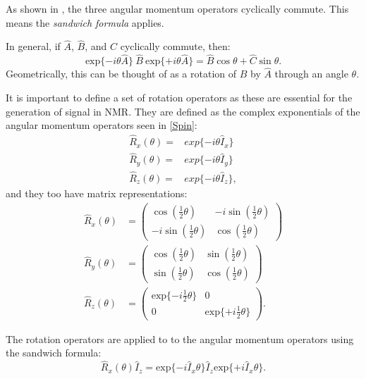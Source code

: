 As shown in , the three angular momentum operators cyclically
commute. This means the \textit{sandwich formula} applies.

In general, if $\hat{A}$, $\hat{B}$, and $\hat{C}$ cyclically commute, then:
\begin{equation}
  \text{exp}\{-i\theta\hat{A}\}\:\hat{B}\:\text{exp}\{+i\theta\hat{A}\} = \hat{B}\cos{\theta} + \hat{C}\sin{\theta}.
\end{equation}
Geometrically, this can be thought of as a rotation of $\hat{B}$ by $\hat{A}$ through
an angle $\theta$.

It is important to define a set of rotation operators as these are essential for the generation of signal in NMR. They are defined as the complex exponentials of the
angular momentum operators seen in \ref{Spin}:
\begin{align}\label{eqn:RotOp}
  \hat{R}_x(\theta) =& exp\{-i\theta\hat{I}_x\}\\
  \hat{R}_y(\theta) =& exp\{-i\theta\hat{I}_y\}\\
  \hat{R}_z(\theta) =& exp\{-i\theta\hat{I}_z\},
\end{align}
 and they too have matrix representations:
 \begin{align}\label{eqn:RotMat}
   \hat{R}_x(\theta)& = \begin{pmatrix}
      \cos(\frac{1}{2}\theta) & -i\sin(\frac{1}{2}\theta)\\
      -i\sin(\frac{1}{2}\theta) & \cos(\frac{1}{2}\theta)
 \end{pmatrix}\\
 \hat{R}_y(\theta)& = \begin{pmatrix}
    \cos(\frac{1}{2}\theta) & \sin(\frac{1}{2}\theta)\\
    \sin(\frac{1}{2}\theta) & \cos(\frac{1}{2}\theta)
\end{pmatrix}\\
\hat{R}_z(\theta)& = \begin{pmatrix}
    \text{exp}\{-i\frac{1}{2}\theta\} & 0\\
    0 & \text{exp}\{+i\frac{1}{2}\theta\}
\end{pmatrix}.
 \end{align}

The rotation operators are applied to to the angular momentum operators using the sandwich formula:
\begin{equation}
  \hat{R}_x(\theta)\hat{I}_z = \text{exp}\{-i\hat{I}_x\theta\}\hat{I}_z\text{exp}\{+i\hat{I}_x\theta\}.
\end{equation}

